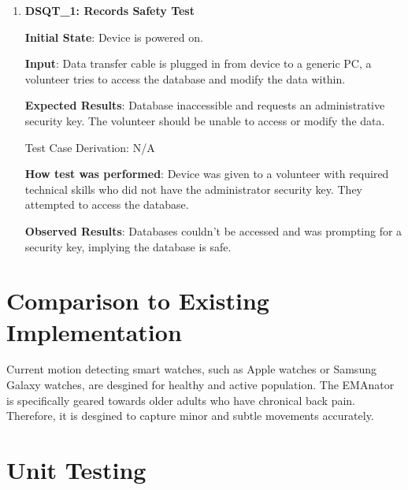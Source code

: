 \documentclass[12pt, titlepage]{article}
\begin{document}
\begin{enumerate}

  \item{\textbf{DSQT\_1: Records Safety Test}}\label{DSQT1}

  \textbf{Initial State}: Device is powered on.

  \textbf{Input}: Data transfer cable is plugged in from device to a generic PC, a volunteer tries to access the database and modify the data within.

  \textbf{Expected Results}: Database inaccessible and requests an administrative security key. The volunteer should be unable to access or modify the data.

  Test Case Derivation: N/A

  \textbf{How test was performed}: Device was given to a volunteer with required technical skills who did not have the administrator security key. They attempted to access the database.

  \textbf{Observed Results}: Databases couldn't be accessed and was prompting for a security key, implying the database is safe.

\end{enumerate}


\section{Comparison to Existing Implementation}
Current motion detecting smart watches, such as Apple watches or Samsung Galaxy watches, are desgined for healthy and active population. The EMAnator is specifically geared towards older adults who have chronical back pain. Therefore, it is desgined to capture minor and subtle movements accurately.

\section{Unit Testing}
\end{document}
